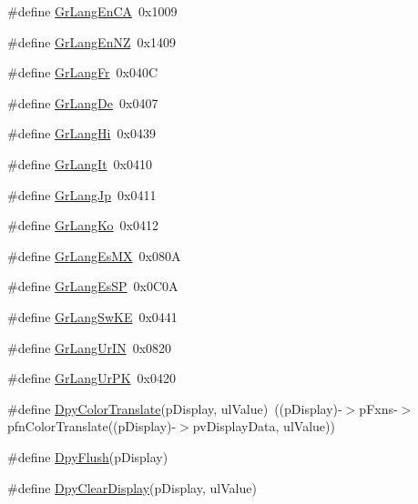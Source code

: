 \begin{DoxyCompactItemize}
\item 
\#define \hyperlink{group__primitives__api_ga7e34c44d82b3607e848796a0feb10b21}{Gr\+Lang\+En\+C\+A}~0x1009
\item 
\#define \hyperlink{group__primitives__api_ga2d9b840ec32e3556c4a73e5de612a0d5}{Gr\+Lang\+En\+N\+Z}~0x1409
\item 
\#define \hyperlink{group__primitives__api_ga551e8d24b87d69cbd19167daa9a106ff}{Gr\+Lang\+Fr}~0x040\+C
\item 
\#define \hyperlink{group__primitives__api_gafd48d2c7e62ccfaec2d96b3e9b83c134}{Gr\+Lang\+De}~0x0407
\item 
\#define \hyperlink{group__primitives__api_gabfa5e8222ce38e1235191f24b6dae37a}{Gr\+Lang\+Hi}~0x0439
\item 
\#define \hyperlink{group__primitives__api_ga8ba06fcb06ffc5825bf82f34696490ff}{Gr\+Lang\+It}~0x0410
\item 
\#define \hyperlink{group__primitives__api_gaf1bca101269cef154549f20673813ba9}{Gr\+Lang\+Jp}~0x0411
\item 
\#define \hyperlink{group__primitives__api_ga377136868180f4de76f71cdf9df646f9}{Gr\+Lang\+Ko}~0x0412
\item 
\#define \hyperlink{group__primitives__api_ga431d4840c4ab5fff29ee65760a2217ab}{Gr\+Lang\+Es\+M\+X}~0x080\+A
\item 
\#define \hyperlink{group__primitives__api_gae77e59c687003aab0f37168c6db8cb9f}{Gr\+Lang\+Es\+S\+P}~0x0\+C0\+A
\item 
\#define \hyperlink{group__primitives__api_gad5f550378058f60cf6e90511f4fa6287}{Gr\+Lang\+Sw\+K\+E}~0x0441
\item 
\#define \hyperlink{group__primitives__api_ga40afbc90f41e8b3d9012b82ce9b61c1c}{Gr\+Lang\+Ur\+I\+N}~0x0820
\item 
\#define \hyperlink{group__primitives__api_gab6b0105533dd300c9fa27563b39b3c64}{Gr\+Lang\+Ur\+P\+K}~0x0420
\item 
\#define \hyperlink{group__primitives__api_ga49a5dcca6ebf8e21292437f51803166f}{Dpy\+Color\+Translate}(p\+Display,  ul\+Value)~((p\+Display)-\/$>$p\+Fxns-\/$>$pfn\+Color\+Translate((p\+Display)-\/$>$pv\+Display\+Data, ul\+Value))
\item 
\#define \hyperlink{group__primitives__api_ga32e24d2b562ee1f3e9a673ca100b1de1}{Dpy\+Flush}(p\+Display)
\item 
\#define \hyperlink{group__primitives__api_gaf8a3321fd7d40496d11b2741dbc6dff1}{Dpy\+Clear\+Display}(p\+Display,  ul\+Value)
\item 

\end{DoxyCompactItemize}
